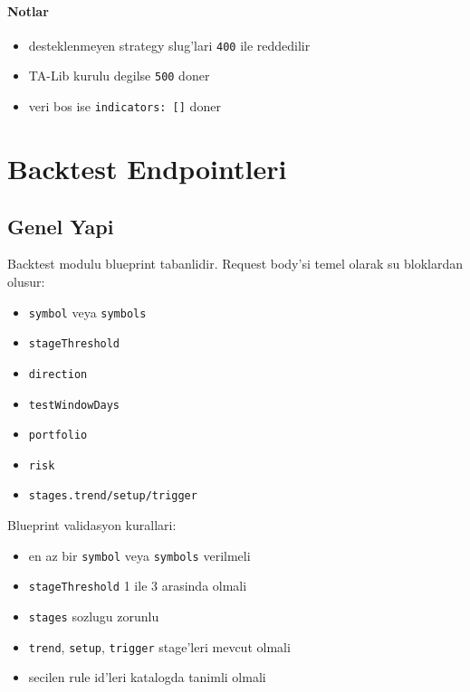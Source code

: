 \documentclass[11pt,a4paper]{article}
\begin{document}
\paragraph{Notlar}
\begin{itemize}[leftmargin=1.5em]
    \item desteklenmeyen strategy slug'lari \texttt{400} ile reddedilir
    \item TA-Lib kurulu degilse \texttt{500} doner
    \item veri bos ise \texttt{indicators: []} doner
\end{itemize}

\section{Backtest Endpointleri}

\subsection{Genel Yapi}

Backtest modulu blueprint tabanlidir. Request body'si temel olarak su bloklardan olusur:

\begin{itemize}[leftmargin=1.5em]
    \item \texttt{symbol} veya \texttt{symbols}
    \item \texttt{stageThreshold}
    \item \texttt{direction}
    \item \texttt{testWindowDays}
    \item \texttt{portfolio}
    \item \texttt{risk}
    \item \texttt{stages.trend/setup/trigger}
\end{itemize}

Blueprint validasyon kurallari:

\begin{itemize}[leftmargin=1.5em]
    \item en az bir \texttt{symbol} veya \texttt{symbols} verilmeli
    \item \texttt{stageThreshold} 1 ile 3 arasinda olmali
    \item \texttt{stages} sozlugu zorunlu
    \item \texttt{trend}, \texttt{setup}, \texttt{trigger} stage'leri mevcut olmali
    \item secilen rule id'leri katalogda tanimli olmali
\end{itemize}
\end{document}
